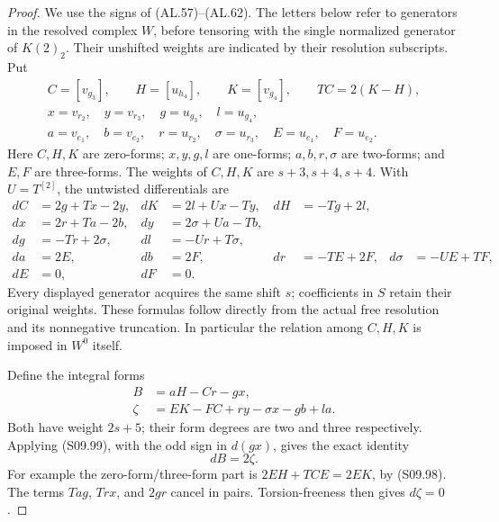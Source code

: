 \begin{proof}
We use the signs of (AL.57)--(AL.62).  The letters below
refer to generators in the resolved complex $W$, before
tensoring with the single normalized generator of
$K(2)_2$.  Their unshifted weights are indicated by
their resolution subscripts.  Put
\[
\begin{gathered}
 C=[v_{g_3}],\qquad H=[u_{h_4}],\qquad K=[v_{g_4}],
       \qquad TC=2(K-H),\\
 x=v_{r_2},\quad y=v_{r_3},\quad
 g=u_{g_3},\quad l=u_{g_4},\\
 a=v_{e_1},\quad b=v_{e_2},\quad
 r=u_{r_2},\quad \sigma=u_{r_3},\quad
 E=u_{e_1},\quad F=u_{e_2}.
\end{gathered}                                      \tag{S09.98}
\]
Here $C,H,K$ are zero-forms; $x,y,g,l$ are one-forms;
$a,b,r,\sigma$ are two-forms; and $E,F$ are three-forms.
The weights of $C,H,K$ are $s+3,s+4,s+4$.
With $U=T^{[2]}$, the untwisted differentials are
\[
\begin{aligned}
 dC&=2g+Tx-2y,& dK&=2l+Ux-Ty,& dH&=-Tg+2l,\\
 dx&=2r+Ta-2b,&dy&=2\sigma+Ua-Tb,\\
 dg&=-Tr+2\sigma,&dl&=-Ur+T\sigma,\\
 da&=2E,&db&=2F,&dr&=-TE+2F,&
 d\sigma&=-UE+TF,\\
 dE&=0,&dF&=0.
\end{aligned}                                      \tag{S09.99}
\]
Every displayed generator acquires the same shift $s$;
coefficients in $S$ retain their original weights.
These formulas follow directly from the actual free
resolution and its nonnegative truncation.  In particular
the relation among $C,H,K$ is imposed in $W^0$ itself.

Define the integral forms
\[
 \begin{split}
 B&=aH-Cr-gx,\\
 \zeta&=EK-FC+ry-\sigma x-gb+la.
 \end{split}                                       \tag{S09.100}
\]
Both have weight $2s+5$; their form degrees are two and
three respectively.  Applying (S09.99), with the odd
sign in $d(gx)$, gives the exact identity
\[
                         dB=2\zeta.                \tag{S09.101}
\]
For example the zero-form/three-form part is
$2EH+TCE=2EK$, by (S09.98).  The terms $Tag$,
$Trx$, and $2gr$ cancel in pairs.  Torsion-freeness
then gives $d\zeta=0$.


\end{proof}

